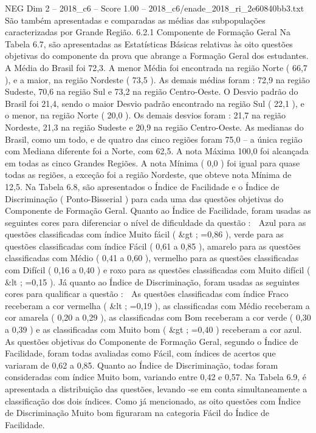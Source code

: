 \begin{textsample}{NEG Dim 2 – 2018\_c6 – Score 1.00 – 2018\_c6/enade\_2018\_ri\_2e60840bb3.txt}
São também apresentadas e comparadas as médias das subpopulações caracterizadas por Grande Região. 6.2.1 Componente de Formação Geral Na Tabela 6.7, são apresentadas as Estatísticas Básicas relativas às oito questões objetivas do componente da prova que abrange a Formação Geral dos estudantes.
A Média do Brasil foi 72,3.
A menor Média foi encontrada na região Norte ( 66,7 ), e a maior, na região Nordeste ( 73,5 ).
As demais médias foram : 72,9 na região Sudeste, 70,6 na região Sul e 73,2 na região Centro-Oeste.
O Desvio padrão do Brasil foi 21,4, sendo o maior Desvio padrão encontrado na região Sul ( 22,1 ), e o menor, na região Norte ( 20,0 ).
Os demais desvios foram : 21,7 na região Nordeste, 21,3 na região Sudeste e 20,9 na região Centro-Oeste.
As medianas do Brasil, como um todo, e de quatro das cinco regiões foram 75,0 – a única região com Mediana diferente foi a Norte, com 62,5.
A nota Máxima 100,0 foi alcançada em todas as cinco Grandes Regiões.
A nota Mínima ( 0,0 ) foi igual para quase todas as regiões, a exceção foi a região Nordeste, que obteve nota Mínima de 12,5.
Na Tabela 6.8, são apresentados o Índice de Facilidade e o Índice de Discriminação ( Ponto-Bisserial ) para cada uma das questões objetivas do Componente de Formação Geral.
Quanto ao Índice de Facilidade, foram usadas as seguintes cores para diferenciar o nível de dificuldade da questão :  Azul para as questões classificadas com índice Muito fácil ( \&gt ; =0,86 ), verde para as questões classificadas com índice Fácil ( 0,61 a 0,85 ), amarelo para as questões classificadas com Médio ( 0,41 a 0,60 ), vermelho para as questões classificadas com Difícil ( 0,16 a 0,40 ) e roxo para as questões classificadas com Muito difícil ( \&lt ; =0,15 ).
Já quanto ao Índice de Discriminação, foram usadas as seguintes cores para qualificar a questão :  As questões classificadas com índice Fraco receberam a cor vermelha ( \&lt ; =0,19 ), as classificadas com Médio receberam a cor amarela ( 0,20 a 0,29 ), as classificadas com Bom receberam a cor verde ( 0,30 a 0,39 ) e as classificadas com Muito bom ( \&gt ; =0,40 ) receberam a cor azul.
As questões objetivas do Componente de Formação Geral, segundo o Índice de Facilidade, foram todas avaliadas como Fácil, com índices de acertos que variaram de 0,62 a 0,85.
Quanto ao Índice de Discriminação, todas foram consideradas com índice Muito bom, variando entre 0,42 e 0,57.
Na Tabela 6.9, é apresentada a distribuição das questões, levando -se em conta simultaneamente a classificação dos dois índices.
Como já mencionado, as oito questões com Índice de Discriminação Muito bom figuraram na categoria Fácil do Índice de Facilidade.

\end{textsample}
